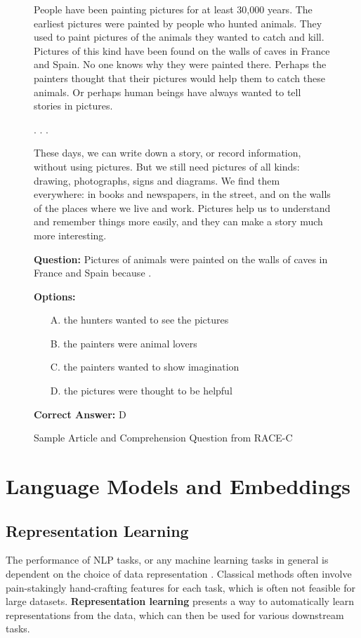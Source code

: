 \begin{figure}[htbp]
	\centering
	\begin{tcolorbox}[colback=gray!5!white, colframe=black]
		\small
		People have been painting pictures for at least 30,000 years. The earliest pictures were painted by people who hunted animals. They used to paint pictures of the animals they wanted to catch and kill. Pictures of this kind have been found on the walls of caves in France and Spain. No one knows why they were painted there. Perhaps the painters thought that their pictures would help them to catch these animals. Or perhaps human beings have always wanted to tell stories in pictures.
		
		.
		.
		.
		
		These days, we can write down a story, or record information, without using pictures. But we still need pictures of all kinds: drawing, photographs, signs and diagrams. We find them everywhere: in books and newspapers, in the street, and on the walls of the places where we live and work. Pictures help us to understand and remember things more easily, and they can make a story much more interesting.
		\vspace{0.5em}

		\textbf{Question:} Pictures of animals were painted on the walls of caves in France and Spain because \underline{\hspace{3cm}}.
		
		\textbf{Options:}
		\begin{itemize}
			\item[A.] the hunters wanted to see the pictures
			\item[B.] the painters were animal lovers
			\item[C.] the painters wanted to show imagination
			\item[D.] the pictures were thought to be helpful
		\end{itemize}
		
		\textbf{Correct Answer:} D
	\end{tcolorbox}
	\caption{Sample Article and Comprehension Question from RACE-C}
	\label{fig:race-c-sample}
\end{figure}


\section{Language Models and Embeddings}

\subsection{Representation Learning}
The performance of NLP tasks, or any machine learning tasks in general is dependent on the choice of data representation \cite{bengioRepresentationLearningReview2014}.
Classical methods often involve pain-stakingly hand-crafting features for each task, which is often not feasible for large datasets. \textbf{Representation learning}
presents a way to automatically learn representations from the data, which can then be used for various downstream tasks. 

